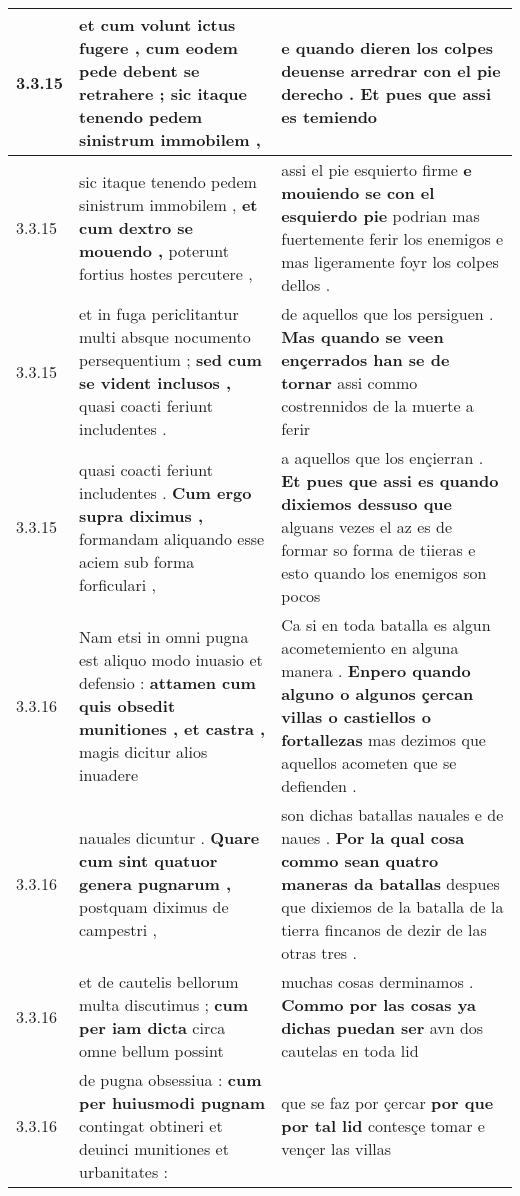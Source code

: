 \begin{tabular}{|p{1cm}|p{6.5cm}|p{6.5cm}|}
3.3.15 & et cum volunt ictus fugere , \textbf{ cum eodem pede debent se retrahere ; } sic itaque tenendo pedem sinistrum immobilem , & e quando dieren los colpes \textbf{ deuense arredrar con el pie derecho . } Et pues que assi es temiendo \\\hline
3.3.15 & sic itaque tenendo pedem sinistrum immobilem , \textbf{ et cum dextro se mouendo , } poterunt fortius hostes percutere , & assi el pie esquierto firme \textbf{ e mouiendo se con el esquierdo pie } podrian mas fuertemente ferir los enemigos e mas ligeramente foyr los colpes dellos . \\\hline
3.3.15 & et in fuga periclitantur multi absque nocumento persequentium ; \textbf{ sed cum se vident inclusos , } quasi coacti feriunt includentes . & de aquellos que los persiguen . \textbf{ Mas quando se veen ençerrados han se de tornar } assi commo costrennidos de la muerte a ferir \\\hline
3.3.15 & quasi coacti feriunt includentes . \textbf{ Cum ergo supra diximus , } formandam aliquando esse aciem sub forma forficulari , & a aquellos que los ençierran . \textbf{ Et pues que assi es quando dixiemos dessuso que } alguans vezes el az es de formar so forma de tiieras e esto quando los enemigos son pocos \\\hline
3.3.16 & Nam etsi in omni pugna est aliquo modo inuasio et defensio : \textbf{ attamen cum quis obsedit munitiones , et castra , } magis dicitur alios inuadere & Ca si en toda batalla es algun acometemiento en alguna manera . \textbf{ Enpero quando alguno o algunos çercan villas o castiellos o fortallezas } mas dezimos que aquellos acometen que se defienden . \\\hline
3.3.16 & nauales dicuntur . \textbf{ Quare cum sint quatuor genera pugnarum , } postquam diximus de campestri , & son dichas batallas nauales e de naues . \textbf{ Por la qual cosa commo sean quatro maneras da batallas } despues que dixiemos de la batalla de la tierra fincanos de dezir de las otras tres . \\\hline
3.3.16 & et de cautelis bellorum multa discutimus ; \textbf{ cum per iam dicta } circa omne bellum possint & muchas cosas derminamos . \textbf{ Commo por las cosas ya dichas puedan ser } avn dos cautelas en toda lid \\\hline
3.3.16 & de pugna obsessiua : \textbf{ cum per huiusmodi pugnam } contingat obtineri et deuinci munitiones et urbanitates : & que se faz por çercar \textbf{ por que por tal lid } contesçe tomar e vençer las villas \\\hline

\end{tabular}
